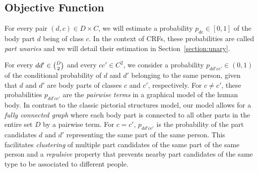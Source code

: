 \subsection{Objective Function}
%

For every pair $(d, c) \in D \times C$, we will estimate a probability $p_{dc} \in [0,1]$ of the body part $d$ being of class $c$.
In the context of CRFs, these probabilities are called \emph{part unaries} and we will detail their estimation in Section~\ref{section:unary}.

For every $dd' \in \tbinom{D}{2}$ and every $cc' \in C^2$, we consider a probability
$p_{dd'cc'} \in (0,1)$ of the conditional probability of $d$
and $d'$ belonging to the same person, given that $d$ and $d'$ are
body parts of classes $c$ and $c'$, respectively.
%
For $c \neq c'$, these probabilities $p_{dd'cc'}$ are the \emph{pairwise terms} in a graphical model of the human body.
In contrast to the classic pictorial structures model, our model allows for a {\em fully connected graph} where each body part is connected to all other parts in the entire set $D$ by a pairwise term.
%
For $c = c'$, $p_{dd'cc'}$ is the probability of the part candidates
$d$ and $d'$ representing the same part of the same person. This
facilitates \textit{clustering} of multiple part candidates of the
same part of the same person and a \textit{repulsive} property that
prevents nearby part candidates of the same type to be associated to
different people.


